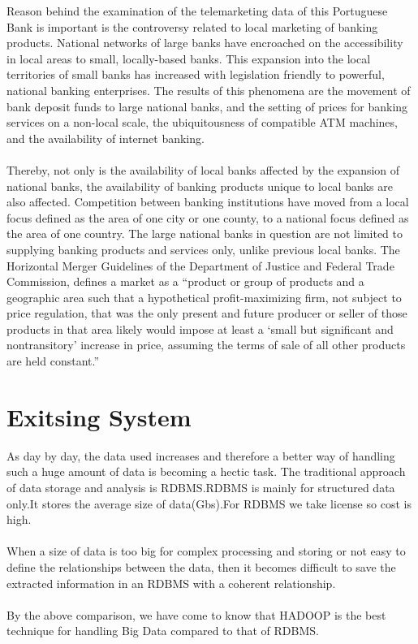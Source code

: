  Reason behind the examination of the telemarketing data of this Portuguese Bank is important is the controversy related to local marketing of banking products. National networks of large banks have encroached on the accessibility in local areas to small, locally-based banks. This expansion into the local territories of small banks has increased with legislation friendly to powerful, national banking enterprises. The results of this phenomena are the movement of bank deposit funds to large national banks, and the setting of prices for banking services on a non-local scale, the ubiquitousness of compatible ATM machines, and the availability of internet banking.
 \\
 \\
 Thereby, not only is the availability of local banks affected by the expansion of national banks, the availability of banking products unique to local banks are also affected. Competition between banking institutions have moved from a local focus defined as the area of one city or one county, to a national focus defined as the area of one country. The large national banks in question are not limited to supplying banking products and services only, unlike previous local banks. The Horizontal Merger Guidelines of the Department of Justice and Federal Trade Commission, defines a market as a “product or group of products and a geographic area such that a hypothetical profit-maximizing firm, not subject to price regulation, that was the only present and future producer or seller of those products in that area likely would impose at least a ‘small but significant and nontransitory’ increase in price, assuming the terms of sale of all other products are held constant.”
 \section {Exitsing System}
 
 As day by day, the data used increases and therefore a better way of handling such a huge amount of data is becoming a hectic task. The traditional approach of data storage and analysis is RDBMS.RDBMS is mainly for structured data only.It stores the average size of data(Gbs).For RDBMS we take license so cost is high.
 \\
 \\
  When a size of data is too big for complex processing and storing or not easy to define the relationships between the data, then it becomes difficult to save the extracted information in an RDBMS with a coherent relationship.
  \\
  \\
  By the above comparison, we have come to know that HADOOP is the best technique for handling Big Data compared to that of RDBMS.
  

